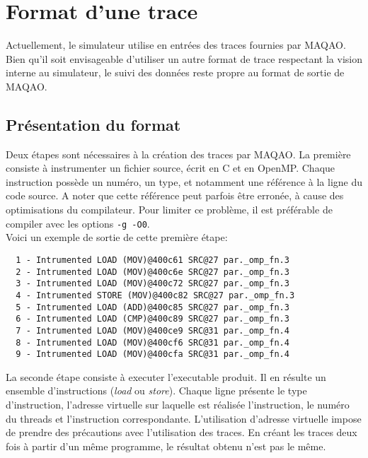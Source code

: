 \section{Format d'une trace}
Actuellement, le simulateur utilise en entrées des traces fournies par \textsf{MAQAO}. Bien qu'il soit envisageable d'utiliser un autre format de trace respectant la vision interne au simulateur, le suivi des données reste propre au format de sortie de \textsf{MAQAO}.

\subsection{Présentation du format}
Deux étapes sont nécessaires à la création des traces par \textsf{MAQAO}. La première consiste à instrumenter un fichier source, écrit en \textsf{C} et en \textsf{OpenMP}. Chaque instruction possède un numéro, un type, et notamment une référence à la ligne du code source. A noter que cette référence peut parfois être erronée, à cause des optimisations du compilateur. Pour limiter ce problème, il est préférable de compiler avec les options \texttt{-g -O0}. \\

Voici un exemple de sortie de cette première étape: \\
\begin{framed}
\begin{verbatim}
  1 - Intrumented LOAD (MOV)@400c61 SRC@27 par._omp_fn.3
  2 - Intrumented LOAD (MOV)@400c6e SRC@27 par._omp_fn.3
  3 - Intrumented LOAD (MOV)@400c72 SRC@27 par._omp_fn.3
  4 - Intrumented STORE (MOV)@400c82 SRC@27 par._omp_fn.3
  5 - Intrumented LOAD (ADD)@400c85 SRC@27 par._omp_fn.3
  6 - Intrumented LOAD (CMP)@400c89 SRC@27 par._omp_fn.3
  7 - Intrumented LOAD (MOV)@400ce9 SRC@31 par._omp_fn.4
  8 - Intrumented LOAD (MOV)@400cf6 SRC@31 par._omp_fn.4
  9 - Intrumented LOAD (MOV)@400cfa SRC@31 par._omp_fn.4
\end{verbatim}
\end{framed}

La seconde étape consiste à executer l'executable produit. Il en résulte un ensemble d'instructions (\emph{load} ou \emph{store}). Chaque ligne présente le type d'instruction, l'adresse virtuelle sur laquelle est réalisée l'instruction, le numéro du threads et l'instruction correspondante. L'utilisation d'adresse virtuelle impose de prendre des précautions avec l'utilisation des traces. En créant les traces deux fois à partir d'un même programme, le résultat obtenu n'est pas le même.\\

